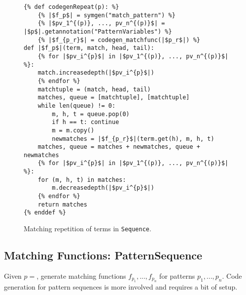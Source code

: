 \begin{figure}[ht]
\begin{verbatim}
{% def codegenRepeat(p): %}
	{% |$f_p$| = symgen("match_pattern") %}
	{% |$pv_1^{(p)}, ..., pv_n^{(p)}$| = |$p$|.getannotation("PatternVariables") %}
	{% |$f_{p_r}$| = codegen_matchfunc(|$p_r$|) %}
def |$f_p$|(term, match, head, tail):
	{% for |$pv_i^{p}$| in |$pv_1^{(p)}, ..., pv_n^{(p)}$| %}:
	match.increasedepth(|$pv_i^{p}$|)
	{% endfor %}
	matchtuple = (match, head, tail)
	matches, queue = [matchtuple], [matchtuple]
	while len(queue) != 0:
		m, h, t = queue.pop(0)
		if h == t: continue
		m = m.copy()
		newmatches = |$f_{p_r}$|(term.get(h), m, h, t)
	matches, queue = matches + newmatches, queue + newmatches
	{% for |$pv_i^{p}$| in |$pv_1^{(p)}, ..., pv_n^{(p)}$| %}:
	for (m, h, t) in matches:
		m.decreasedepth(|$pv_i^{p}$|)
	{% endfor %}
	return matches
{% enddef %}
\end{verbatim}
\caption{Matching repetition of terms \RepeatNoArg \space in \texttt{Sequence}.}
\label{codegen-pattern-ellipsis-1}
\end{figure}


\subsection{Matching Functions: PatternSequence}
Given $p=$\space \PatternSequence, generate matching functions $f_{p_1}, ..., f_{p_n}$ for patterns $p_1, ..., p_n$. Code generation for pattern sequences is more involved and requires a bit of setup.

